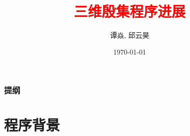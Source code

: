 \documentclass[UTF8]{ctexbeamer}	%
\title{\textcolor{red}{三维殷集程序进展}}
\author{谭焱, 邱云昊 
 }
\date{\today}
\theoremstyle{plain}
\theoremstyle{definition}
\theoremstyle{remark}
\numberwithin{equation}{section}
\begin{document}

\begin{frame}
    \titlepage
\end{frame}


\begin{frame}
    \frametitle{提纲}
    \tableofcontents
\end{frame}

\section{程序背景}

\end{document}
